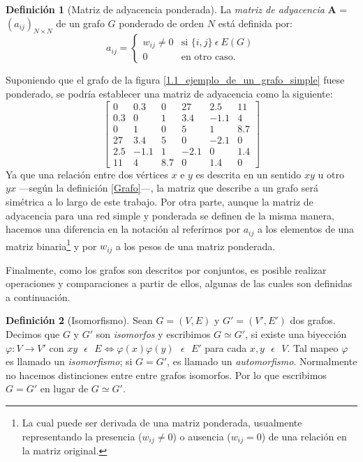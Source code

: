 \documentclass[letterpaper, 11pt]{book}
\theoremstyle{definition}
\newtheorem{definition}{Definición}[chapter]
\theoremstyle{remark}
\begin{document}
\begin{definition}[Matriz de adyacencia ponderada]
\label{MatrizAdyacenciaPonderada}
    La \emph{matriz de adyacencia} \textbf{A} = $(a_{ij})_{N \times N}$ de un grafo $G$ ponderado de orden $N$ está definida por:
    \[ a_{ij} = \left\{ \begin{array}{ll}
	w_{ij} \neq 0 & \text{si } \{i,j\} \ \epsilon \ E(G)\\
	0 & \text{en otro caso.}\end{array} \right. \]
\end{definition}
Suponiendo que el grafo de la figura \ref{1.1_ejemplo_de_un_grafo_simple} fuese ponderado, se podría establecer una matriz de adyacencia como la siguiente:
\[
\begin{bmatrix}
    0   & 0.3 & 0    & 27   & 2.5  & 11\\
    0.3 & 0   & 1    & 3.4  & -1.1  & 4\\
    0   & 1   & 0    & 5    & 1    & 8.7\\
    27  & 3.4 & 5    & 0    & -2.1 & 0\\
    2.5 & -1.1& 1    & -2.1 & 0    & 1.4\\
    11  & 4   & 8.7  & 0    & 1.4  & 0
\end{bmatrix}
\]
Ya que una relación entre dos vértices $x$ e $y$ es descrita en un sentido $xy$ u otro $yx$ ---según la definición \ref{Grafo}---, la matriz que describe a un grafo será simétrica a lo largo de este trabajo.
Por otra parte, aunque la matriz de adyacencia para una red simple y ponderada se definen de la misma manera, hacemos una diferencia en la notación al referirnos por $a_{ij}$ a los elementos de una matriz binaria\footnote{
    La cual puede ser derivada de una matriz ponderada, usualmente representando la presencia ($w_{ij}\neq0$) o ausencia ($w_{ij}=0$) de una relación en la matriz original.
} y por $w_{ij}$ a los pesos de una matriz ponderada. 


Finalmente, como los grafos son descritos por conjuntos, es posible realizar operaciones y comparaciones a partir de ellos, algunas de las cuales son definidas a continuación.

\begin{definition}[Isomorfismo]
\label{Isomorfismo}
	Sean $G = (V,E)$ y $G' = (V',E')$ dos grafos. Decimos que $G$ y $G'$ son \emph{isomorfos} y escribimos $G \simeq G'$, si existe una biyección $\varphi: V \rightarrow V'$ con $xy \text{ } \epsilon \text{ } E \Leftrightarrow \varphi(x)\varphi(y) \text{ } \epsilon \text{ } E'$ para cada $x,y \text{ } \epsilon \text{ }V$. Tal mapeo $\varphi$ es llamado un \emph{isomorfismo}; si $G= G'$, es llamado un \emph{automorfismo}. Normalmente no hacemos distinciones entre entre grafos isomorfos. Por lo que escribimos $G=G'$ en lugar de $G \simeq G'$.
\end{definition}
\end{document}
